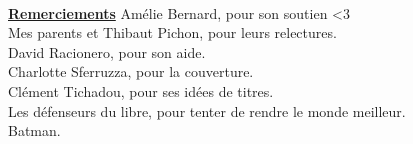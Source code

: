 \begin{titlepage}
~\vfill
\begin{center}

\begin{minipage}[c]{\textwidth}
	\begin{center}
	{\large \textbf{\underline{Remerciements}}}
	\linebreak
	\linebreak
	Amélie Bernard, pour son soutien <3\\
	Mes parents et Thibaut Pichon, pour leurs relectures.\\
	David Racionero, pour son aide.\\
	Charlotte Sferruzza, pour la couverture.\\
	Clément Tichadou, pour ses idées de titres.\\
	Les défenseurs du libre, pour tenter de rendre le monde meilleur.\\
	Batman.
	\end{center}
\end{minipage}

\vspace{0.3\textheight}


\end{center}
\end{titlepage}

